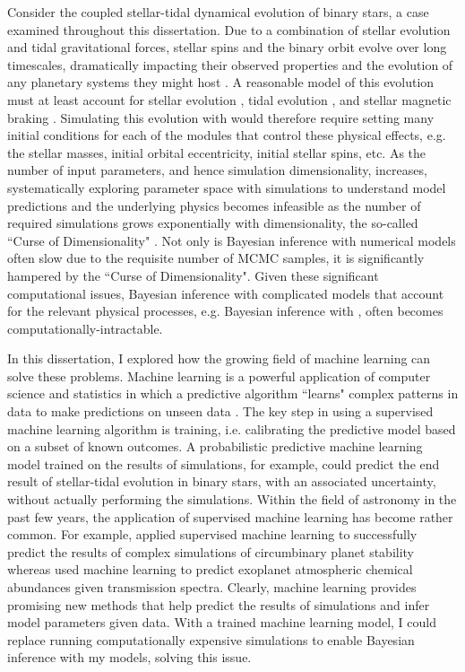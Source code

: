 Consider the coupled stellar-tidal dynamical evolution of binary stars, a case examined throughout this dissertation. Due to a combination of stellar evolution and tidal gravitational forces, stellar spins and the binary orbit evolve over long timescales, dramatically impacting their observed properties and the evolution of any planetary systems they might host \citep[for example, see][for how tides circularize binary orbits over time]{Zahn1989,Meibom2005}. A reasonable model of this evolution must at least account for stellar evolution \citep[e.g.][]{Baraffe2015}, tidal evolution \citep[e.g.][]{Hut1981,FerrazMello2008,Leconte2010}, and stellar magnetic braking \citep[e.g.][]{Matt2015}. Simulating this evolution with \vplanet would therefore require setting many initial conditions for each of the modules that control these physical effects, e.g. the stellar masses, initial orbital eccentricity, initial stellar spins, etc.  As the number of input parameters, and hence simulation dimensionality, increases, systematically exploring parameter space with simulations to understand model predictions and the underlying physics becomes infeasible as the number of required simulations grows exponentially with dimensionality, the so-called ``Curse of Dimensionality" \citep{Bellman1957}.  Not only is Bayesian inference with numerical models often slow due to the requisite number of MCMC samples, it is significantly hampered by the ``Curse of Dimensionality". Given these significant computational issues, Bayesian inference with complicated models that account for the relevant physical processes, e.g. Bayesian inference with \vplanet, often becomes computationally-intractable.

In this dissertation, I explored how the growing field of machine learning can solve these problems. Machine learning is a powerful application of computer science and statistics in which a predictive algorithm ``learns" complex patterns in data to make predictions on unseen data \citep[see][for a thorough review]{Murphy2012}. The key step in using a supervised machine learning algorithm is training, i.e. calibrating the predictive model based on a subset of known outcomes.  A probabilistic predictive machine learning model trained on the results of \vplanet simulations, for example, could predict the end result of stellar-tidal evolution in binary stars, with an associated uncertainty, without actually performing the simulations.  Within the field of astronomy in the past few years, the application of supervised machine learning has become rather common. For example, \citet{Lam2018} applied supervised machine learning to successfully predict the results of complex simulations of circumbinary planet stability whereas \citet{Waldmann2016} used machine learning to predict exoplanet atmospheric chemical abundances given transmission spectra. Clearly, machine learning provides promising new methods that help predict the results of simulations and infer model parameters given data. With a trained machine learning model, I could replace running computationally expensive simulations to enable Bayesian inference with my models, solving this issue. 

